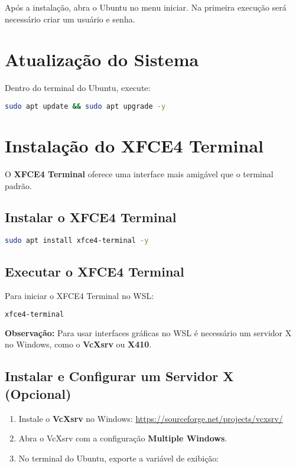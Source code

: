 \documentclass[12pt,a4paper]{article}
\begin{document}
Após a instalação, abra o Ubuntu no menu iniciar. Na primeira execução será necessário criar um usuário e senha.

\section{Atualização do Sistema}

Dentro do terminal do Ubuntu, execute:

\begin{lstlisting}[language=bash]
sudo apt update && sudo apt upgrade -y
\end{lstlisting}

\section{Instalação do XFCE4 Terminal}

O \textbf{XFCE4 Terminal} oferece uma interface mais amigável que o terminal padrão.

\subsection{Instalar o XFCE4 Terminal}

\begin{lstlisting}[language=bash]
sudo apt install xfce4-terminal -y
\end{lstlisting}

\subsection{Executar o XFCE4 Terminal}

Para iniciar o XFCE4 Terminal no WSL:

\begin{lstlisting}[language=bash]
xfce4-terminal
\end{lstlisting}

\textbf{Observação:} Para usar interfaces gráficas no WSL é necessário um servidor X no Windows, como o \textbf{VcXsrv} ou \textbf{X410}.

\subsection{Instalar e Configurar um Servidor X (Opcional)}

\begin{enumerate}
    \item Instale o \textbf{VcXsrv} no Windows: \url{https://sourceforge.net/projects/vcxsrv/}
    \item Abra o VcXsrv com a configuração \textbf{Multiple Windows}.
    \item No terminal do Ubuntu, exporte a variável de exibição:
\end{enumerate}
\end{document}
